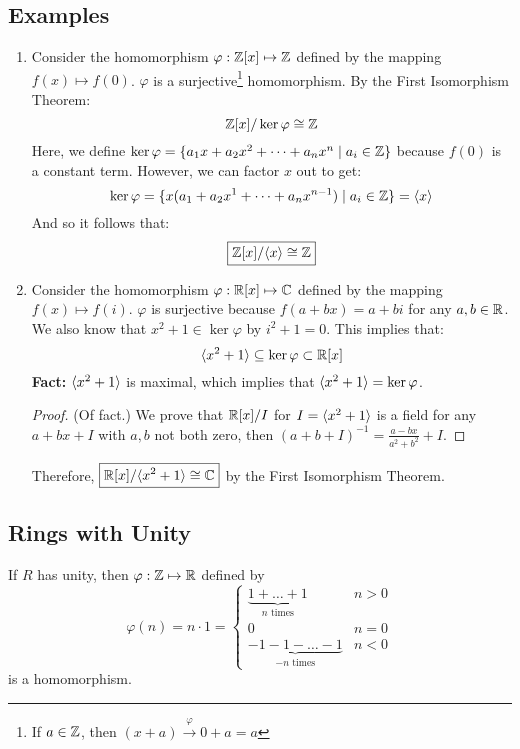 \documentclass[letterpaper]{article}
\begin{document}
\subsection{Examples}

\begin{enumerate}
    \item Consider the homomorphism $\varphi: \mathbb{Z}[x] \mapsto \mathbb{Z}$ defined by the mapping $f(x) \mapsto f(0)$. $\varphi$ is a surjective\footnote{If $a \in \mathbb{Z}$, then $(x + a) \xrightarrow{\varphi} 0 + a = a$} homomorphism. By the First Isomorphism Theorem:
    \[\mathbb{Z}[x] / \ker\varphi \cong \mathbb{Z}\]
    Here, we define $\ker\varphi = \{a_1 x + a_2 x^2 + \dots + a_n x^n \mid a_i \in \mathbb{Z}\}$ because $f(0)$ is a constant term. However, we can factor $x$ out to get:
    \[\ker\varphi = \{x(a_1 + a_2 x^1 + \dots + a_n x^{n - 1}) \mid a_i \in \mathbb{Z}\} = \langle x \rangle\]
    And so it follows that:
    \[\boxed{\mathbb{Z}[x] / \langle x \rangle \cong \mathbb{Z}}\]


    \item Consider the homomorphism $\varphi: \mathbb{R}[x] \mapsto \mathbb{C}$ defined by the mapping $f(x) \mapsto f(i)$. $\varphi$ is surjective because $f(a + bx) = a + bi$ for any $a, b \in \mathbb{R}$. We also know that $x^2 + 1 \in \ker \varphi$ by $i^2 + 1 = 0$. This implies that: 
    \[\langle x^2 + 1 \rangle \subseteq \ker \varphi \subset \mathbb{R}[x]\]
    \textbf{Fact:} $\langle x^2 + 1 \rangle$ is maximal, which implies that $\langle x^2 + 1 \rangle = \ker \varphi$.
    \begin{mdframed}[]
        \begin{proof}
            (Of fact.) We prove that $\mathbb{R}[x] / I$ for $I = \langle x^2 + 1 \rangle$ is a field for any $a + bx + I$ with $a, b$ not both zero, then $(a + b + I)^{-1} = \frac{a - bx}{a^2 + b^2} + I$.
        \end{proof}
    \end{mdframed}
    Therefore, $\boxed{\mathbb{R}[x] / \langle x^2 + 1 \rangle \cong \mathbb{C}}$ by the First Isomorphism Theorem. 
\end{enumerate}

\subsection{Rings with Unity}
\begin{proposition}
    If $R$ has unity, then $\varphi: \mathbb{Z} \mapsto \mathbb{R}$ defined by
    \[\varphi(n) = n \cdot 1 = \begin{cases}
        \underbrace{1 + \dots + 1}_{n \text{ times}} & n > 0 \\ 
        0 & n = 0 \\ 
        \underbrace{-1 - 1 - \dots - 1}_{-n \text{ times}} & n < 0
    \end{cases}\]
    is a homomorphism.
\end{proposition}
\end{document}
